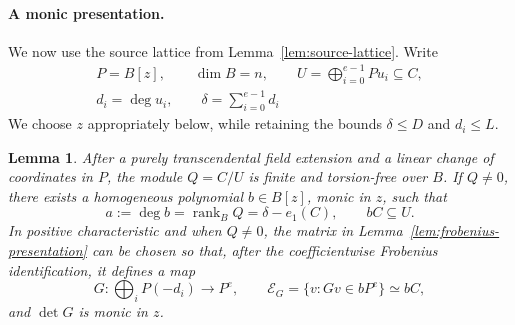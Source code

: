 \documentclass[12pt]{amsart}
\numberwithin{equation}{section}
\newtheorem{lemma}[theorem]{Lemma}
\theoremstyle{definition}
\theoremstyle{remark}
\numberwithin{equation}{section}
\begin{document}
\paragraph{\textbf{A monic presentation.}}
We now use the source lattice from Lemma~\ref{lem:source-lattice}.
Write
\[
\begin{gathered}
P=B[z],\qquad \dim B=n,\qquad
U=\bigoplus_{i=0}^{e-1}Pu_i\subseteq C,\\
d_i=\deg u_i,\qquad \delta=\sum_{i=0}^{e-1} d_i
\end{gathered}
\]
We choose $z$ appropriately below, while retaining the bounds $\delta\le D$ and $d_i\le L$.

\begin{lemma}\label{lem:monic-defect}
After a purely transcendental field extension and a linear change of coordinates in $P$, the module $Q=C/U$ is finite and torsion-free over
$B$. If $Q\ne0$, there exists a homogeneous polynomial $b\in B[z]$, monic in $z$, such that
\[
 a:=\deg b=\operatorname{rank}_BQ=\delta-e_1(C),\qquad bC\subseteq U.
\]
In positive characteristic  and when $Q\ne0$, the matrix in Lemma~\ref{lem:frobenius-presentation} can be chosen so that, after the coefficientwise Frobenius identification, it defines a map
\[
 G:\bigoplus_iP(-d_i)\longrightarrow P^e,
 \qquad
 \mathcal E_G=\{v:Gv\in bP^e\}\simeq bC,
\]
and $\det G$ is monic in $z$.
\end{lemma}
\end{document}
